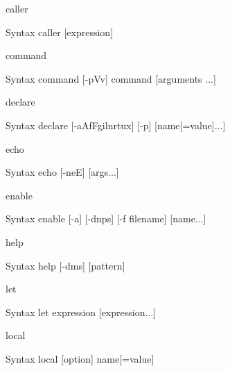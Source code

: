 \documentclass[10pt, compress, aspectratio=169]{beamer}
\begin{document}
\begin{frame}{caller}
  \begin{alertblock}{Syntax}
    caller [expression]
  \end{alertblock}
  
\end{frame}

\begin{frame}{command}
  \begin{alertblock}{Syntax}
    command [-pVv] command [arguments ...]
  \end{alertblock}
\end{frame}

\begin{frame}{declare}
  \begin{alertblock}{Syntax}
    declare [-aAfFgilnrtux] [-p] [name[=value]...]
  \end{alertblock}
\end{frame}

\begin{frame}{echo}
  \begin{alertblock}{Syntax}
    echo [-neE] [args...]
  \end{alertblock}
\end{frame}

\begin{frame}{enable}
  \begin{alertblock}{Syntax}
    enable [-a] [-dnps] [-f filename] [name...]
  \end{alertblock}
\end{frame}

\begin{frame}{help}
  \begin{alertblock}{Syntax}
    help [-dms] [pattern]
  \end{alertblock}
\end{frame}

\begin{frame}{let}
  \begin{alertblock}{Syntax}
    let expression [expression...]
  \end{alertblock}
\end{frame}

\begin{frame}{local}
  \begin{alertblock}{Syntax}
    local [option] name[=value]
  \end{alertblock}
\end{frame}
\end{document}
